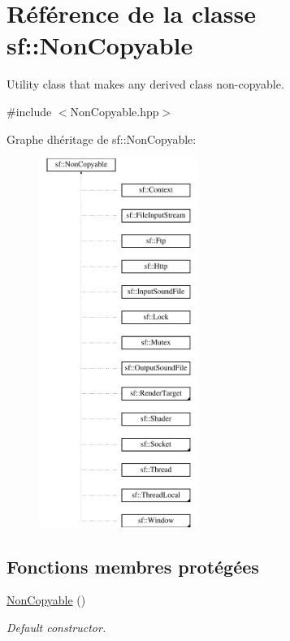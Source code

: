 \hypertarget{classsf_1_1NonCopyable}{}\section{Référence de la classe sf\+:\+:Non\+Copyable}
\label{classsf_1_1NonCopyable}


Utility class that makes any derived class non-\/copyable.  




{\ttfamily \#include $<$Non\+Copyable.\+hpp$>$}

Graphe d\textquotesingle{}héritage de sf\+:\+:Non\+Copyable\+:\begin{figure}[H]
\begin{center}
\leavevmode
\includegraphics[height=12.000000cm]{classsf_1_1NonCopyable}
\end{center}
\end{figure}
\subsection*{Fonctions membres protégées}
\begin{DoxyCompactItemize}
\item 
\hyperlink{classsf_1_1NonCopyable_a2110add170580fdb946f887719da6860}{Non\+Copyable} ()
\begin{DoxyCompactList}\small\item\em Default constructor. \end{DoxyCompactList}\end{DoxyCompactItemize}


